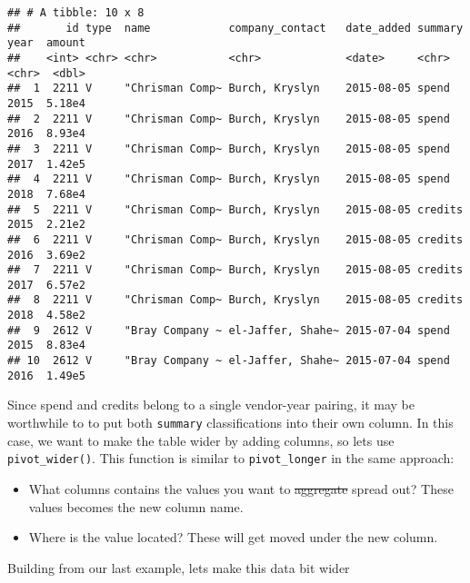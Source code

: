 \documentclass[
]{book}
\newenvironment{Shaded}{\begin{snugshade}}{\end{snugshade}}
\newcommand{\CommentTok}[1]{\textcolor[rgb]{0.56,0.35,0.01}{\textit{#1}}}
\newcommand{\DataTypeTok}[1]{\textcolor[rgb]{0.13,0.29,0.53}{#1}}
\newcommand{\KeywordTok}[1]{\textcolor[rgb]{0.13,0.29,0.53}{\textbf{#1}}}
\newcommand{\NormalTok}[1]{#1}
\newcommand{\OperatorTok}[1]{\textcolor[rgb]{0.81,0.36,0.00}{\textbf{#1}}}
\newcommand{\StringTok}[1]{\textcolor[rgb]{0.31,0.60,0.02}{#1}}
\providecommand{\tightlist}{%
  \setlength{\itemsep}{0pt}\setlength{\parskip}{0pt}}
\begin{document}
\begin{verbatim}
## # A tibble: 10 x 8
##       id type  name            company_contact   date_added summary year  amount
##    <int> <chr> <chr>           <chr>             <date>     <chr>   <chr>  <dbl>
##  1  2211 V     "Chrisman Comp~ Burch, Kryslyn    2015-08-05 spend   2015  5.18e4
##  2  2211 V     "Chrisman Comp~ Burch, Kryslyn    2015-08-05 spend   2016  8.93e4
##  3  2211 V     "Chrisman Comp~ Burch, Kryslyn    2015-08-05 spend   2017  1.42e5
##  4  2211 V     "Chrisman Comp~ Burch, Kryslyn    2015-08-05 spend   2018  7.68e4
##  5  2211 V     "Chrisman Comp~ Burch, Kryslyn    2015-08-05 credits 2015  2.21e2
##  6  2211 V     "Chrisman Comp~ Burch, Kryslyn    2015-08-05 credits 2016  3.69e2
##  7  2211 V     "Chrisman Comp~ Burch, Kryslyn    2015-08-05 credits 2017  6.57e2
##  8  2211 V     "Chrisman Comp~ Burch, Kryslyn    2015-08-05 credits 2018  4.58e2
##  9  2612 V     "Bray Company ~ el-Jaffer, Shahe~ 2015-07-04 spend   2015  8.83e4
## 10  2612 V     "Bray Company ~ el-Jaffer, Shahe~ 2015-07-04 spend   2016  1.49e5
\end{verbatim}

Since spend and credits belong to a single vendor-year pairing, it may be worthwhile to to put both \texttt{summary} classifications into their own column. In this case, we want to make the table wider by adding columns, so lets use \texttt{pivot\_wider()}. This function is similar to \texttt{pivot\_longer} in the same approach:

\begin{itemize}
\tightlist
\item
  What columns contains the values you want to \sout{aggregate} spread out? These values becomes the new column name.
\item
  Where is the value located? These will get moved under the new column.
\end{itemize}

Building from our last example, lets make this data bit wider

\begin{Shaded}
\end{Shaded}
\end{document}
